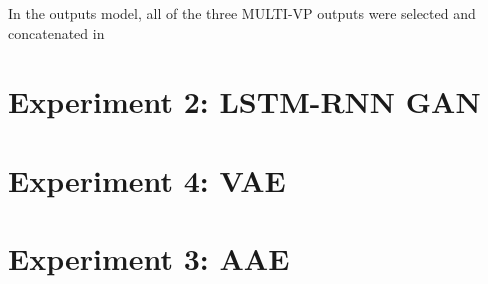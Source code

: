 In the outputs model, all of the three MULTI-VP outputs were selected and concatenated in








\section{Experiment 2: LSTM-RNN GAN}\label{sec:gan_experiment_2}
\section{Experiment 4: VAE}\label{sec:mad-gan}
\section{Experiment 3: AAE}\label{sec:gan_experiment_3}

